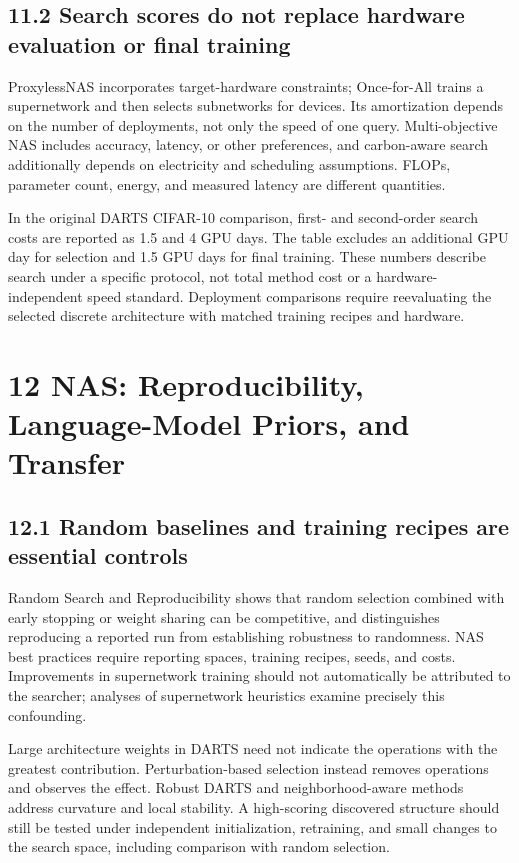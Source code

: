 \subsection*{11.2 Search scores do not replace hardware evaluation or final training}

ProxylessNAS incorporates target-hardware constraints; Once-for-All trains a supernetwork and then selects subnetworks for devices.\cite{r138,r145} Its amortization depends on the number of deployments, not only the speed of one query. Multi-objective NAS includes accuracy, latency, or other preferences, and carbon-aware search additionally depends on electricity and scheduling assumptions.\cite{r163,r164} FLOPs, parameter count, energy, and measured latency are different quantities.


In the original DARTS CIFAR-10 comparison, first- and second-order search costs are reported as 1.5 and 4 GPU days.\cite{r136} The table excludes an additional GPU day for selection and 1.5 GPU days for final training. These numbers describe search under a specific protocol, not total method cost or a hardware-independent speed standard. Deployment comparisons require reevaluating the selected discrete architecture with matched training recipes and hardware.


\section*{12 NAS: Reproducibility, Language-Model Priors, and Transfer}

\subsection*{12.1 Random baselines and training recipes are essential controls}

Random Search and Reproducibility shows that random selection combined with early stopping or weight sharing can be competitive, and distinguishes reproducing a reported run from establishing robustness to randomness.\cite{r140} NAS best practices require reporting spaces, training recipes, seeds, and costs.\cite{r146} Improvements in supernetwork training should not automatically be attributed to the searcher; analyses of supernetwork heuristics examine precisely this confounding.\cite{r157}


Large architecture weights in DARTS need not indicate the operations with the greatest contribution. Perturbation-based selection instead removes operations and observes the effect.\cite{r156} Robust DARTS and neighborhood-aware methods address curvature and local stability.\cite{r147,r155} A high-scoring discovered structure should still be tested under independent initialization, retraining, and small changes to the search space, including comparison with random selection.


